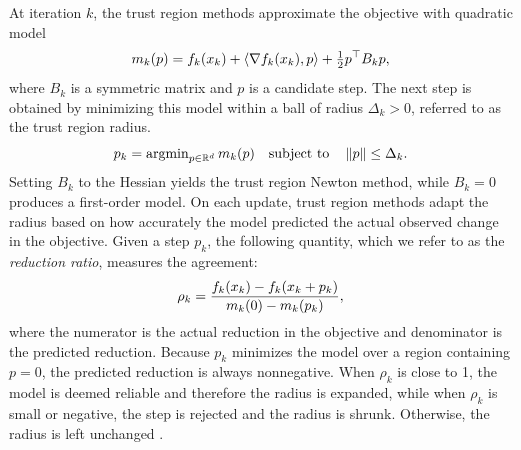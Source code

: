   At iteration $k$, the trust region methods approximate the objective with quadratic model
  \begin{equation}
      m_k(p) = f_k(x_{k}) + \langle \nabla f_k(x_{k}), p \rangle + \tfrac{1}{2} p^\top B_k p,
      \label{eq:tr_model}
  \end{equation}
  where $B_k$ is a symmetric matrix and $p$ is a candidate step. The next step is obtained by minimizing this model within a ball of radius $\Delta_k > 0$, referred to as the trust region radius.
  \begin{equation}
      p_k = \operatorname{argmin}_{p \in \mathbb{R}^d} m_k(p) \quad \text{subject to} \quad \left \lVert p \right \rVert \le \Delta_k.
      \label{eq:tr_subproblem}
  \end{equation}
  Setting $B_k$ to the Hessian yields the trust region Newton method, while $B_k = 0$ \cite{nocedal2006numerical} produces a first-order model. On each update, trust region methods adapt the radius based on how accurately the model predicted the actual observed change in the objective. Given a step $p_k$, the following quantity, which we refer to as the \textit{reduction ratio}, measures the agreement:
  \begin{equation}
      \rho_k = \frac{f_k(x_{k}) - f_k(x_{k} + p_k)}{m_k(0) - m_k(p_k)},
      \label{eq:tr_ratio}
  \end{equation}
  where the numerator is the actual reduction in the objective and denominator is the predicted reduction. Because $p_k$ minimizes the model over a region containing $p = 0$, the predicted reduction is always nonnegative. When $\rho_k$ is close to 1, the model is deemed reliable and therefore the radius is expanded, while when $\rho_k$ is small or negative, the step is rejected and the radius is shrunk. Otherwise, the radius is left unchanged \cite{nocedal2006numerical}.
  
